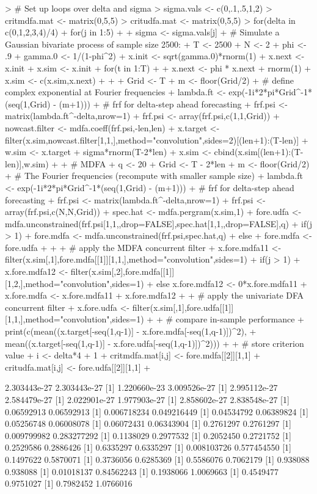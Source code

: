 \documentclass[a4paper]{book}
\begin{document}
\begin{Schunk}
\begin{Sinput}
> # Set up loops over delta and sigma
> sigma.vals <- c(0,.1,.5,1,2)
> critmdfa.mat <- matrix(0,5,5)
> critudfa.mat <- matrix(0,5,5)
> for(delta in c(0,1,2,3,4)/4) {
+ for(j in 1:5) {
+ 
+ sigma <- sigma.vals[j]
+ # Simulate a Gaussian bivariate process of sample size 2500:
+ T <- 2500
+ N <- 2
+ phi <- .9
+ gamma.0 <- 1/(1-phi^2)
+ x.init <- sqrt(gamma.0)*rnorm(1)
+ x.next <- x.init
+ x.sim <- x.init
+ for(t in 1:T)
+ {
+ 	x.next <- phi * x.next + rnorm(1)
+ 	x.sim <- c(x.sim,x.next)
+ }
+ 
+ Grid <- T
+ m <- floor(Grid/2)
+ # define complex exponential at Fourier frequencies
+ lambda.ft <- exp(-1i*2*pi*Grid^{-1}*(seq(1,Grid) - (m+1)))
+ # frf for delta-step ahead forecasting
+ frf.psi <- matrix(lambda.ft^{-delta},nrow=1) 
+ frf.psi <- array(frf.psi,c(1,1,Grid))
+ nowcast.filter <- mdfa.coeff(frf.psi,-len,len)
+ x.target <- filter(x.sim,nowcast.filter[1,1,],method="convolution",sides=2)[(len+1):(T-len)]
+ w.sim <- x.target + sigma*rnorm(T-2*len)
+ x.sim <- cbind(x.sim[(len+1):(T-len)],w.sim)
+ 
+ # MDFA
+ q <- 20
+ Grid <- T - 2*len
+ m <- floor(Grid/2)
+ # The Fourier frequencies (recompute with smaller sample size)
+ lambda.ft <- exp(-1i*2*pi*Grid^{-1}*(seq(1,Grid) - (m+1)))
+ # frf for delta-step ahead forecasting
+ frf.psi <- matrix(lambda.ft^{-delta},nrow=1) %
+ frf.psi <- array(frf.psi,c(N,N,Grid))
+ spec.hat <- mdfa.pergram(x.sim,1)	
+ fore.udfa <- mdfa.unconstrained(frf.psi[1,1,,drop=FALSE],spec.hat[1,1,,drop=FALSE],q)
+ if(j > 1) { 
+ 	fore.mdfa <- mdfa.unconstrained(frf.psi,spec.hat,q) 
+ } else {
+ 	fore.mdfa <- fore.udfa 
+ }
+   
+ # apply the MDFA concurrent filter
+ x.fore.mdfa11 <- filter(x.sim[,1],fore.mdfa[[1]][1,1,],method="convolution",sides=1)
+ if(j > 1) { 
+ 	x.fore.mdfa12 <- filter(x.sim[,2],fore.mdfa[[1]][1,2,],method="convolution",sides=1) 
+ } else { x.fore.mdfa12 <- 0*x.fore.mdfa11 }
+ x.fore.mdfa <- x.fore.mdfa11 + x.fore.mdfa12 
+ 
+ # apply the univariate DFA concurrent filter
+ x.fore.udfa <- filter(x.sim[,1],fore.udfa[[1]][1,1,],method="convolution",sides=1)
+ 
+ # compare in-sample performance
+ print(c(mean((x.target[-seq(1,q-1)] - x.fore.mdfa[-seq(1,q-1)])^2),
+ 	mean((x.target[-seq(1,q-1)] - x.fore.udfa[-seq(1,q-1)])^2)))
+ 
+ # store criterion value
+ i <- delta*4 + 1
+ critmdfa.mat[i,j] <- fore.mdfa[[2]][1,1]
+ critudfa.mat[i,j] <- fore.udfa[[2]][1,1]
+ }}
\end{Sinput}
\begin{Soutput}
[1] 2.303443e-27 2.303443e-27
[1] 1.220660e-23 3.009526e-27
[1] 2.995112e-27 2.584479e-27
[1] 2.022901e-27 1.977903e-27
[1] 2.858602e-27 2.838548e-27
[1] 0.06592913 0.06592913
[1] 0.006718234 0.049216449
[1] 0.04534792 0.06389824
[1] 0.05256748 0.06008078
[1] 0.06072431 0.06343904
[1] 0.2761297 0.2761297
[1] 0.009799982 0.283277292
[1] 0.1138029 0.2977532
[1] 0.2052450 0.2721752
[1] 0.2529586 0.2886426
[1] 0.6335297 0.6335297
[1] 0.008103726 0.577454550
[1] 0.1497622 0.5870071
[1] 0.3736056 0.6285369
[1] 0.5586076 0.7062179
[1] 0.938088 0.938088
[1] 0.01018137 0.84562243
[1] 0.1938066 1.0069663
[1] 0.4549477 0.9751027
[1] 0.7982452 1.0766016
\end{Soutput}
\end{Schunk}
\end{document}
